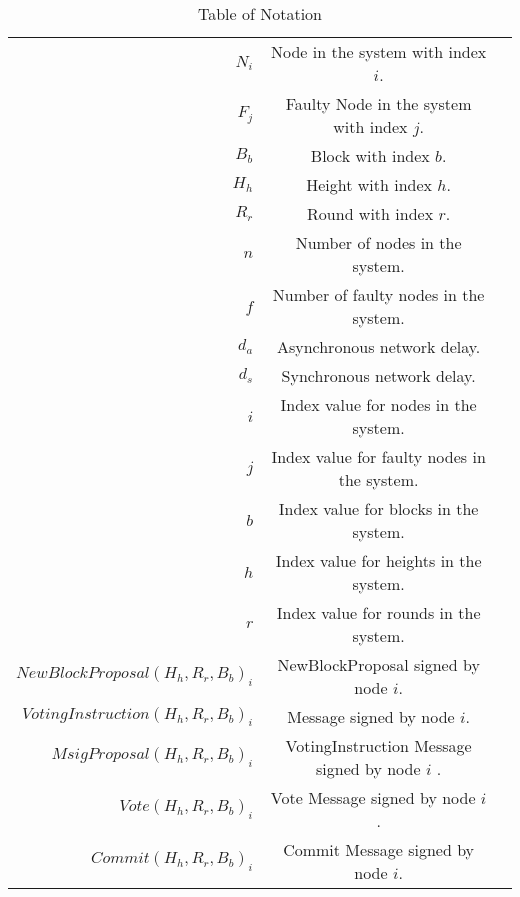 \begin{table}[htbp]
\caption{Table of Notation}
\begin{center}%
\label{2-1}
\begin{adjustbox}{max width=1.1\textwidth}
\begin{tabular}{r c p{0cm} }
\toprule

$N_{i}$ & Node in the system with index $i$.&\\
${F}_{j}$ & Faulty Node in the system with index $j$.&\\
${B}_{b}$ & Block with index $b$.&\\
${H}_{h}$ & Height with index $h$.&\\
${R}_{r}$ & Round with index $r$.&\\
$n$ & Number of nodes in the system.&\\
$f$ & Number of faulty nodes in the system.&\\
$d_{a}$ & Asynchronous network delay.&\\
$d_{s}$ & Synchronous network delay.&\\
$i$ & Index value for nodes in the system.&\\
$j$ & Index value for faulty nodes in the system.&\\
$b$ & Index value for blocks in the system.&\\
$h$ & Index value for heights in the system.&\\
$r$ & Index value for rounds in the system.&\\
$NewBlockProposal(H_h,R_r,B_b)_{i}$ & NewBlockProposal signed by node $i$.&\\
$VotingInstruction(H_h,R_r,B_b)_{i}$ & Message signed by node $i$.&\\
$MsigProposal(H_h,R_r,B_b)_{i}$ & VotingInstruction Message signed by node $i$ .&\\
$Vote(H_h,R_r,B_b)_{i}$ & Vote Message signed by node $i$.&\\
$Commit(H_h,R_r,B_b)_{i}$ & Commit Message signed by node $i$.&\\

\bottomrule
\end{tabular}
\end{adjustbox}
\end{center}
\end{table}